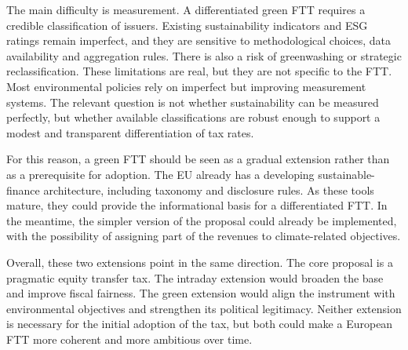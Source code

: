 \documentclass[../../main]{subfiles}
\begin{document}
The main difficulty is measurement. A differentiated green FTT requires a credible classification of issuers. Existing sustainability indicators and ESG ratings remain imperfect, and they are sensitive to methodological choices, data availability and aggregation rules. There is also a risk of greenwashing or strategic reclassification. These limitations are real, but they are not specific to the FTT. Most environmental policies rely on imperfect but improving measurement systems. The relevant question is not whether sustainability can be measured perfectly, but whether available classifications are robust enough to support a modest and transparent differentiation of tax rates.

For this reason, a green FTT should be seen as a gradual extension rather than as a prerequisite for adoption. The EU already has a developing sustainable-finance architecture, including taxonomy and disclosure rules. As these tools mature, they could provide the informational basis for a differentiated FTT. In the meantime, the simpler version of the proposal could already be implemented, with the possibility of assigning part of the revenues to climate-related objectives.

Overall, these two extensions point in the same direction. The core proposal is a pragmatic equity transfer tax. The intraday extension would broaden the base and improve fiscal fairness. The green extension would align the instrument with environmental objectives and strengthen its political legitimacy. Neither extension is necessary for the initial adoption of the tax, but both could make a European FTT more coherent and more ambitious over time.




\end{document}
